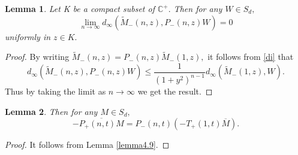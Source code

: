 \documentclass[reqno]{amsart}
\numberwithin{equation}{section}
\newcommand{\C}{\mathbb{C}}
\newtheorem{lemma}{Lemma}[section]
\begin{document}
\begin{lemma} \label{lemma 4.11 } Let K be a compact subset of $\C^+.$ Then for any $W\in S_d,$
	 $$ \lim_{n\rightarrow \infty}	d_{\infty}(\tilde M_-(n, z),  P_-(n, z)W) = 0  $$  uniformly in $z\in K .$\end{lemma}
 
 \begin{proof}  By writing $\tilde M_-(n, z) = P_{-}(n,z) \tilde M_-(1,z),$ it follows from \eqref{di}  that $$		d_{\infty}(\tilde M_-(n, z),  P_-(n, z)W) \leq  \frac{1}{(1+y^2)^{n-1}}	d_{\infty}( \tilde M_-(1, z),  W)  .$$ Thus by taking the limit as $n \rightarrow \infty $ we get the result. \end{proof}


\begin{lemma}  Then for any $M\in S_d,$
	 $$ -\overline{P_+(n,t)M} = P_-(n,t)(-T_+(1, t)\overline{M} )   .$$\end{lemma}
 \begin{proof} It follows from Lemma \ref{lemma4.9}.  \end{proof}
\end{document}

